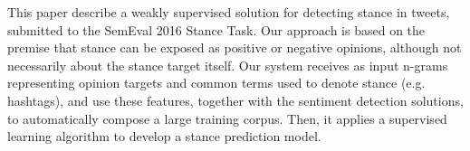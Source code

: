 This paper describe a weakly supervised solution for detecting stance in tweets, submitted to the SemEval 2016 Stance Task. Our approach is based on the premise that stance can be exposed as positive or negative opinions, although not necessarily about the stance target itself. Our system receives as input n-grams representing opinion targets and common terms used to denote stance (e.g. hashtags), and use these features, together with the sentiment detection solutions, to automatically compose a large training corpus. Then, it applies a supervised learning algorithm to develop a stance prediction model.

